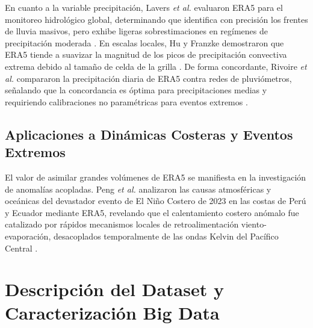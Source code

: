 \documentclass[conference]{IEEEtran}
\begin{document}
En cuanto a la variable precipitación, Lavers \textit{et al.} evaluaron ERA5 para el monitoreo hidrológico global, determinando que identifica con precisión los frentes de lluvia masivos, pero exhibe ligeras sobrestimaciones en regímenes de precipitación moderada \cite{lavers2022evaluation}. En escalas locales, Hu y Franzke demostraron que ERA5 tiende a suavizar la magnitud de los picos de precipitación convectiva extrema debido al tamaño de celda de la grilla \cite{Hu_2020}. De forma concordante, Rivoire \textit{et al.} compararon la precipitación diaria de ERA5 contra redes de pluviómetros, señalando que la concordancia es óptima para precipitaciones medias y requiriendo calibraciones no paramétricas para eventos extremos \cite{Rivoire_2021}.

\subsection{Aplicaciones a Dinámicas Costeras y Eventos Extremos}
El valor de asimilar grandes volúmenes de ERA5 se manifiesta en la investigación de anomalías acopladas. Peng \textit{et al.} analizaron las causas atmosféricas y oceánicas del devastador evento de El Niño Costero de 2023 en las costas de Perú y Ecuador mediante ERA5, revelando que el calentamiento costero anómalo fue catalizado por rápidos mecanismos locales de retroalimentación viento-evaporación, desacoplados temporalmente de las ondas Kelvin del Pacífico Central \cite{peng2024extreme}.

\section{Descripción del Dataset y Caracterización Big Data}
\end{document}
